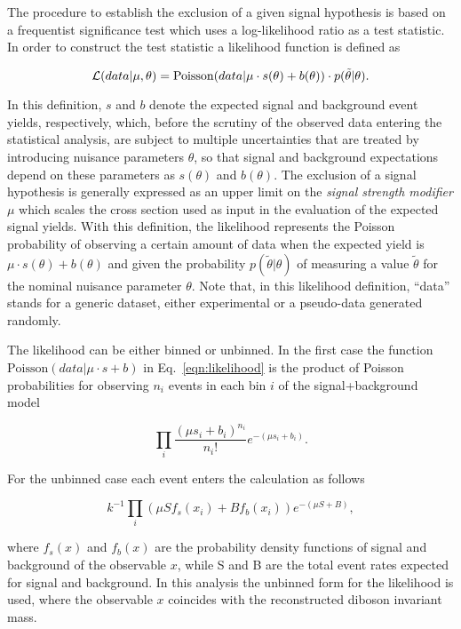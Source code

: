 The procedure to establish the exclusion of a given signal hypothesis is based on a frequentist significance test which uses a log-likelihood ratio as a test statistic.
In order to construct the test statistic a likelihood function is defined as

\begin{equation}\label{eqn:likelihood}
{\cal L}( data | \mu,\theta) = \mathrm{Poisson}(data | \mu\cdot s(\theta) + b(\theta))\cdot p(\tilde{\theta}|\theta).
\end{equation}

In this definition, $s$ and $b$ denote the expected signal and background event yields, respectively,
which, before the scrutiny of the observed data entering the statistical analysis, are subject to multiple uncertainties that are treated by introducing nuisance parameters $\theta$,
so that signal and background expectations depend on these parameters as $s(\theta)$ and $b(\theta)$.
The exclusion of a signal hypothesis is generally expressed as an upper limit on the \textit{signal strength modifier} $\mu$
which scales the cross section used as input in the evaluation of the expected signal yields.
With this definition, the likelihood represents the Poisson probability of observing a certain amount of data when the expected yield is $\mu\cdot s(\theta) + b(\theta)$
and given the probability $p(\tilde{\theta}|\theta)$ of measuring a value $\tilde{\theta}$ for the nominal nuisance parameter $\theta$.
Note that, in this likelihood definition, ``data'' stands for a generic dataset, either experimental or a pseudo-data generated randomly.

The likelihood can be either binned or unbinned. In the first case the function $\mathrm{Poisson}(data | \mu\cdot s + b)$ in Eq.~\ref{eqn:likelihood} is the product of Poisson probabilities
for observing $n_i$ events in each bin $i$ of the signal+background model

\begin{equation}\label{eqn:binned}
\prod_i \frac{(\mu s_{i} +b_{i})^{n_i}}{n_i!}e^{-(\mu s_i + b_i)}.
\end{equation}

For the unbinned case each event enters the calculation as follows

\begin{equation}\label{eqn:unbinned}
k^{-1}\prod_i (\mu S f_s(x_i) + Bf_b(x_i))e^{-(\mu S + B)},
\end{equation}

where $f_s(x)$ and $f_b(x)$ are the probability density functions of signal and background of the observable $x$, while S and B are the total event rates expected for signal and background.
In this analysis the unbinned form for the likelihood is used, where the observable $x$ coincides with the reconstructed diboson invariant mass.\\

